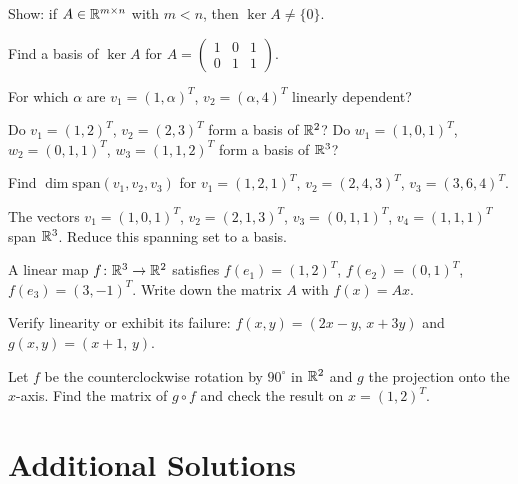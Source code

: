\begin{problems}
    \item Show: if $A \in \mathbb{R}^{m \times n}$ with $m < n$, then $\ker A \neq \{0\}$.
    \item Find a basis of $\ker A$ for $A = \begin{pmatrix} 1 & 0 & 1 \\ 0 & 1 & 1 \end{pmatrix}$.
    \item For which $\alpha$ are $v_{1} = (1, \alpha)^{T}$, $v_{2} = (\alpha, 4)^{T}$ linearly dependent?
    \item Do $v_{1} = (1, 2)^{T}$, $v_{2} = (2, 3)^{T}$ form a basis of $\mathbb{R}^{2}$? Do $w_{1} = (1, 0, 1)^{T}$, $w_{2} = (0, 1, 1)^{T}$, $w_{3} = (1, 1, 2)^{T}$ form a basis of $\mathbb{R}^{3}$?
    \item Find $\dim \mathrm{span}(v_{1}, v_{2}, v_{3})$ for $v_{1} = (1, 2, 1)^{T}$, $v_{2} = (2, 4, 3)^{T}$, $v_{3} = (3, 6, 4)^{T}$.
    \item The vectors $v_{1} = (1, 0, 1)^{T}$, $v_{2} = (2, 1, 3)^{T}$, $v_{3} = (0, 1, 1)^{T}$, $v_{4} = (1, 1, 1)^{T}$ span $\mathbb{R}^{3}$. Reduce this spanning set to a basis.
    \item A linear map $f \colon \mathbb{R}^{3} \to \mathbb{R}^{2}$ satisfies $f(e_{1}) = (1, 2)^{T}$, $f(e_{2}) = (0, 1)^{T}$, $f(e_{3}) = (3, -1)^{T}$. Write down the matrix $A$ with $f(x) = A x$.
    \item Verify linearity or exhibit its failure: $f(x, y) = (2 x - y, \, x + 3 y)$ and $g(x, y) = (x + 1, \, y)$.
    \item Let $f$ be the counterclockwise rotation by $90^{\circ}$ in $\mathbb{R}^{2}$ and $g$ the projection onto the $x$-axis. Find the matrix of $g \circ f$ and check the result on $x = (1, 2)^{T}$.
\end{problems}

\section{Additional Solutions}

